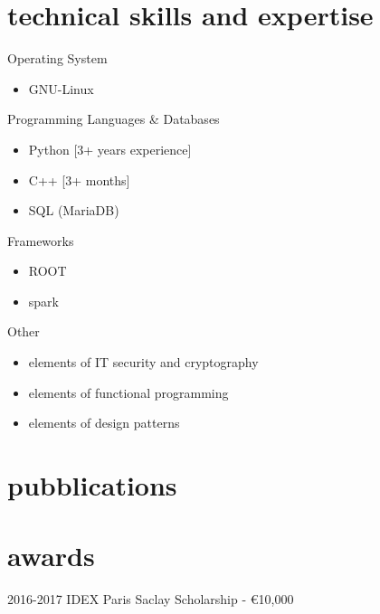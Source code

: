 \documentclass[]{cv-style}     %
\begin{document}
\section{technical skills and expertise}
\par\vspace{.5\parskip}%
 {\color{gray}\headingfont Operating System}
 \begin{itemize}
  \item GNU-Linux
 \end{itemize}
 {\color{gray}\headingfont Programming Languages & Databases}
 \begin{itemize}
  \item Python [3+ years experience]
  \item C++ [3+ months]
  \item SQL (MariaDB)
 \end{itemize}
 {\color{gray}\headingfont Frameworks}
 \begin{itemize}
  \item ROOT
  \item spark
 \end{itemize}
 {\color{gray}\headingfont Other}
 {%
 \begin{itemize}
  \item elements of IT security and cryptography
  \item elements of functional programming
  \item elements of design patterns
 \end{itemize}
 }
 \par\vspace{.5\parskip}
 
\pagebreak
\section{pubblications}
\section{awards}
\par\vspace{.5\parskip}%
\begin{entrylist}
\entry
{2016-2017}
{IDEX Paris Saclay Scholarship - \euro 10,000}
{}
{}
\end{entrylist}
\end{document}

